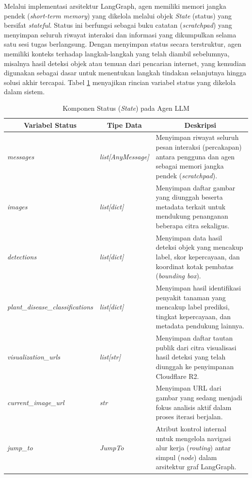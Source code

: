 Melalui implementasi arsitektur LangGraph, agen memiliki memori jangka pendek (\textit{short-term memory}) yang dikelola melalui objek \textit{State} (status) yang bersifat \textit{stateful}. Status ini berfungsi sebagai buku catatan (\textit{scratchpad}) yang menyimpan seluruh riwayat interaksi dan informasi yang dikumpulkan selama satu sesi tugas berlangsung. Dengan menyimpan status secara terstruktur, agen memiliki konteks terhadap langkah-langkah yang telah diambil sebelumnya, misalnya hasil deteksi objek atau temuan dari pencarian internet, yang kemudian digunakan sebagai dasar untuk menentukan langkah tindakan selanjutnya hingga solusi akhir tercapai. Tabel \ref{tab:state_components} menyajikan rincian variabel status yang dikelola dalam sistem.

\begin{table}[H]
    \centering
    \caption{Komponen Status (\textit{State}) pada Agen LLM}
    \label{tab:state_components}
    \small
    \begin{tabular}{|l|l|p{4cm}|}
    \hline
    \multicolumn{1}{|c|}{\textbf{Variabel Status}} & \multicolumn{1}{c|}{\textbf{Tipe Data}} & \multicolumn{1}{c|}{\textbf{Deskripsi}} \\ \hline
    \textit{messages} & \textit{list[AnyMessage]} & Menyimpan riwayat seluruh pesan interaksi (percakapan) antara pengguna dan agen sebagai memori jangka pendek (\textit{scratchpad}). \\ \hline
    \textit{images} & \textit{list[dict]} & Menyimpan daftar gambar yang diunggah beserta metadata terkait untuk mendukung penanganan beberapa citra sekaligus. \\ \hline
    \textit{detections} & \textit{list[dict]} & Menyimpan data hasil deteksi objek yang mencakup label, skor kepercayaan, dan koordinat kotak pembatas (\textit{bounding box}). \\ \hline
    \textit{plant\_disease\_classifications} & \textit{list[dict]} & Menyimpan hasil identifikasi penyakit tanaman yang mencakup label prediksi, tingkat kepercayaan, dan metadata pendukung lainnya. \\ \hline
    \textit{visualization\_urls} & \textit{list[str]} & Menyimpan daftar tautan publik dari citra visualisasi hasil deteksi yang telah diunggah ke penyimpanan Cloudflare R2. \\ \hline
    \textit{current\_image\_url} & \textit{str} & Menyimpan URL dari gambar yang sedang menjadi fokus analisis aktif dalam proses iterasi berjalan. \\ \hline
    \textit{jump\_to} & \textit{JumpTo} & Atribut kontrol internal untuk mengelola navigasi alur kerja (\textit{routing}) antar simpul (\textit{node}) dalam arsitektur graf LangGraph. \\ \hline
    \end{tabular}
\end{table}


